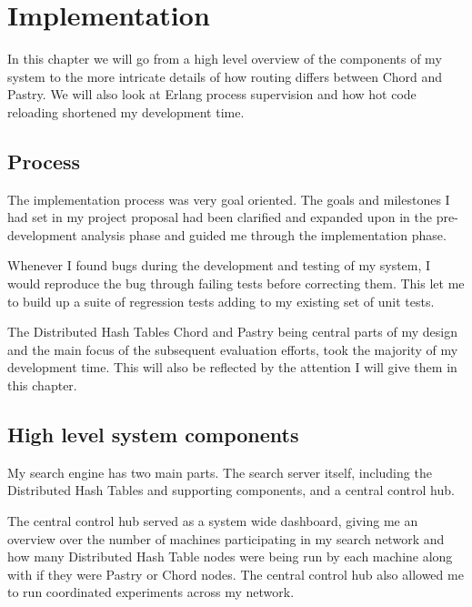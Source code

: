 

\chapter{Implementation}
In this chapter we will go from a high level overview of the components of my system to the more intricate details of how routing differs between Chord and Pastry.
We will also look at Erlang process supervision and how hot code reloading shortened my development time.

\section{Process}
The implementation process was very goal oriented. The goals and milestones I had set in my project proposal had been clarified and expanded upon in the pre-development analysis phase and guided me through the implementation phase.

Whenever I found bugs during the development and testing of my system, I would reproduce the bug through failing tests before correcting them. This let me to build up a suite of regression tests adding to my existing set of unit tests.

The Distributed Hash Tables Chord and Pastry being central parts of my design and the main focus of the subsequent evaluation efforts, took the majority of my development time. This will also be reflected by the attention I will give them in this chapter.


\section{High level system components}
My search engine has two main parts. The search server itself, including the Distributed Hash Tables and supporting components, and a central control hub.

The central control hub served as a system wide dashboard, giving me an overview over the number of machines participating in my search network and how many Distributed Hash Table nodes were being run by each machine along with if they were Pastry or Chord nodes. The central control hub also allowed me to run coordinated experiments across my network.

